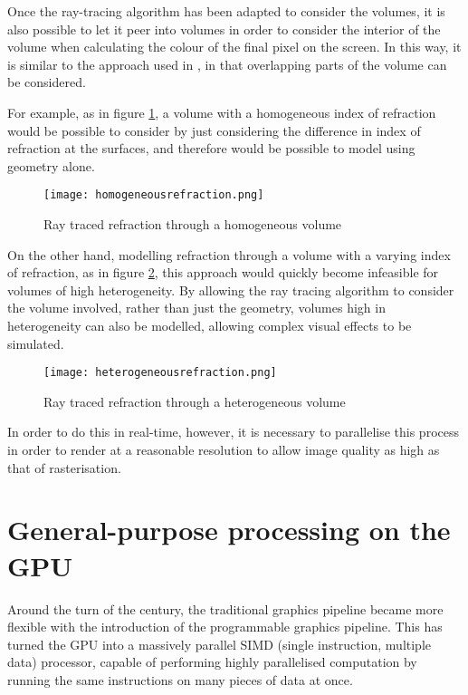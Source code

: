 Once the ray-tracing algorithm has been adapted to consider the volumes, it is also possible to let it peer into volumes in order to consider the interior of the volume when calculating the colour of the final pixel on the screen. In this way, it is similar to the approach used in \cite{engel02interactivehigh-quality}, in that overlapping parts of the volume can be considered.

For example, as in figure \ref{fig:homogeneous_refraction}, a volume with a homogeneous index of refraction would be possible to consider by just considering the difference in index of refraction at the surfaces, and therefore would be possible to model using geometry alone.

\begin{figure}
\centering
	\texttt{[image: homogeneousrefraction.png]}
	\caption{Ray traced refraction through a homogeneous volume}
	\label{fig:homogeneous_refraction}
\end{figure}

On the other hand, modelling refraction through a volume with a varying index of refraction, as in figure \ref{fig:heterogeneous_refraction}, this approach would quickly become infeasible for volumes of high heterogeneity. By allowing the ray tracing algorithm to consider the volume involved, rather than just the geometry, volumes high in heterogeneity can also be modelled, allowing complex visual effects to be simulated.

\begin{figure}
\centering
	\texttt{[image: heterogeneousrefraction.png]}
	\caption{Ray traced refraction through a heterogeneous volume}
	\label{fig:heterogeneous_refraction}
\end{figure}

In order to do this in real-time, however, it is necessary to parallelise this process in order to render at a reasonable resolution to allow image quality as high as that of rasterisation.

\section{General-purpose processing on the GPU}
Around the turn of the century, the traditional graphics pipeline became more flexible with the introduction of the programmable graphics pipeline. This has turned the GPU into a massively parallel SIMD (single instruction, multiple data) processor, capable of performing highly parallelised computation by running the same instructions on many pieces of data at once.

